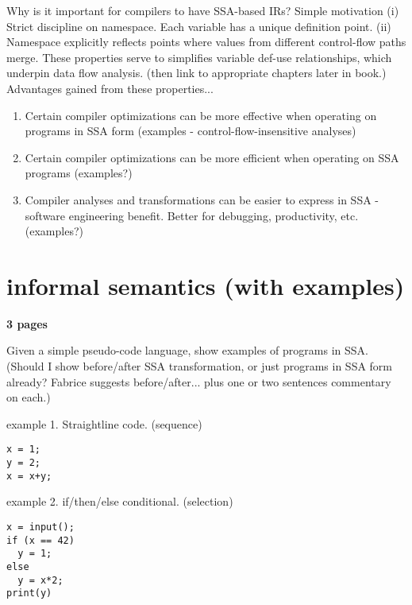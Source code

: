 Why is it important for compilers to have SSA-based IRs? Simple motivation
(i) Strict discipline on namespace. 
Each variable has a unique definition point.
(ii) Namespace explicitly reflects points where values from
different control-flow paths merge. 
These properties serve to simplifies variable def-use relationships,
which underpin data flow analysis.
(then link to appropriate chapters later in book.)
Advantages gained from these properties...
\begin{enumerate}
\item Certain compiler optimizations can be more effective
when operating on programs in SSA form
(examples - control-flow-insensitive
analyses)
\item Certain compiler optimizations can be more efficient
when operating on SSA programs (examples?) 
\item Compiler analyses and transformations can be easier
to express in SSA - software engineering benefit. Better
for debugging, productivity, etc. (examples?)
\end{enumerate}



\section{informal semantics (with examples)}

\textbf{3 pages}

Given a simple pseudo-code language, show examples of programs in SSA.
(Should I show before/after SSA transformation, or just programs
in SSA form already? Fabrice suggests before/after... plus
one or two sentences commentary on each.)

example 1. Straightline code. (sequence)

\begin{verbatim}
x = 1;
y = 2;
x = x+y;
\end{verbatim}

example 2. if/then/else conditional.  (selection)

\begin{verbatim}
x = input();
if (x == 42)
  y = 1;
else
  y = x*2;
print(y)
\end{verbatim}

